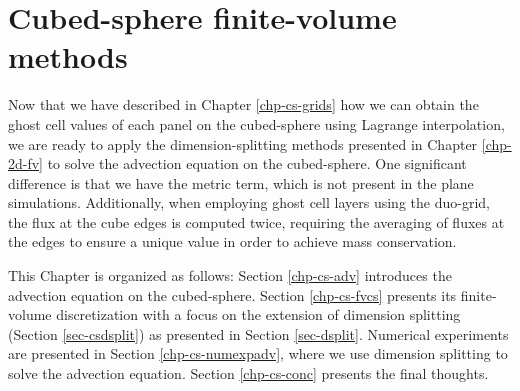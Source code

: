 \chapter{Cubed-sphere finite-volume methods}
\label{chp-cs-fv}
Now that we have described in Chapter \ref{chp-cs-grids} how we can obtain the ghost cell values of each panel on the cubed-sphere using Lagrange interpolation, we are ready to apply the dimension-splitting methods presented in Chapter \ref{chp-2d-fv} to solve the advection equation on the cubed-sphere.
One significant difference is that we have the metric term, which is not present in the plane simulations.
Additionally, when employing ghost cell layers using the duo-grid, the flux at the cube edges is computed twice, 
requiring the averaging of fluxes at the edges to ensure a unique value in order to achieve mass conservation.


This Chapter is organized as follows: Section \ref{chp-cs-adv} introduces the advection equation on the cubed-sphere.
Section \ref{chp-cs-fvcs} presents its finite-volume discretization with a focus on the extension of dimension splitting (Section \ref{sec-csdsplit}) 
as presented in Section \ref{sec-dsplit}.
Numerical experiments are presented in Section \ref{chp-cs-numexpadv}, where we use dimension splitting to solve the advection equation.
Section \ref{chp-cs-conc} presents the final thoughts.

